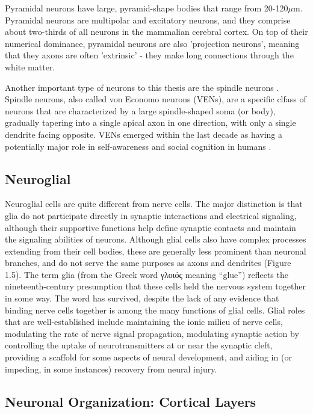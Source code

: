 Pyramidal neurons have large, pyramid-shape bodies that range from 20-120$\mu$m.
Pyramidal neurons are multipolar and excitatory neurons, and they comprise about two-thirds of all neurons in the mammalian cerebral cortex.
On top of their numerical dominance, pyramidal neurons are also 'projection neurons', meaning that they axons are often 'extrinsic' - they make long connections through the white matter.

Another important type of neurons to this thesis are the spindle neurons \cite{Johns}.
Spindle neurons, also called von Economo neurons (VENs), are a specific clfass of neurons that are characterized by a large spindle-shaped soma (or body), gradually tapering into a single apical axon in one direction, with only a single dendrite facing opposite.
VENs emerged within the last decade as having a potentially major role in self-awareness and social cognition in humans \cite{Evrard2012}.

\subsection{Neuroglial}
Neuroglial cells are quite different from nerve cells.
The major distinction is that glia do not participate directly in synaptic interactions and electrical signaling, although their supportive functions help define synaptic contacts and maintain the signaling abilities of neurons.
Although glial cells also have complex processes extending from their cell bodies, these are generally less prominent than neuronal branches, and do not serve the same purposes as axons and dendrites (Figure 1.5).
The term glia (from the Greek word γλοιός meaning “glue”) reflects the nineteenth-century presumption that these cells held the nervous system together in some way.
The word has survived, despite the lack of any evidence that binding nerve cells together is among the many functions of glial cells.
Glial roles that are well-established include maintaining the ionic milieu of nerve cells, modulating the rate of nerve signal propagation, modulating synaptic action by controlling the uptake of neurotransmitters at or near the synaptic cleft, providing a scaffold for some aspects of neural development, and aiding in (or impeding, in some instances) recovery from neural injury.

\subsection{Neuronal Organization: Cortical Layers}

